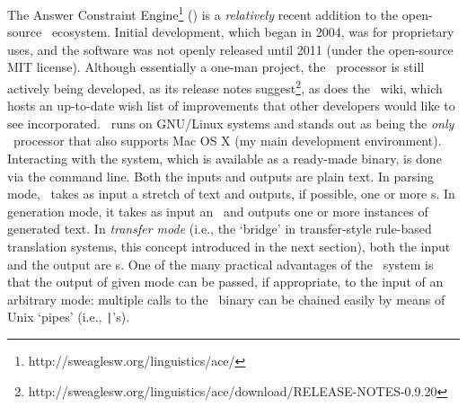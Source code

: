 The Answer Constraint Engine\footnote{http://sweaglesw.org/linguistics/ace/}
(\ace) \citep{sweaglesACE} is a \emph{relatively} recent addition to the
open-source \delphin\ ecosystem. Initial development, which began in 2004, was
for proprietary uses, and the software was not openly released until 2011
(under the open-source MIT license). Although essentially a one-man project,
the \ace\ processor is still actively being developed, as its release notes
suggest\footnote{http://sweaglesw.org/linguistics/ace/download/RELEASE-NOTES-0.9.20},
as does the \delphin\ wiki, which hosts an up-to-date wish list of improvements
that other developers would like to see incorporated. \ace\ runs on GNU/Linux
systems and stands out as being the \emph{only} \delphin\ processor that also
supports Mac OS X (my main development environment). Interacting with the
system, which is available as a ready-made binary, is done via the command
line. Both the inputs and outputs are plain text. In parsing mode, \ace\ takes
as input a stretch of text and outputs, if possible, one or more \mrs s. In
generation mode, it takes as input an \mrs\ and outputs one or more instances
of generated text. In \emph{transfer mode} (i.e., the `bridge' in
transfer-style rule-based translation systems, this concept introduced in the
next section), both the input and the output are \mrs s. One of the many
practical advantages of the \ace\ system is that the output of given mode can
be passed, if appropriate, to the input of an arbitrary mode: multiple calls to
the \ace\ binary can be chained easily by means of Unix `pipes' (i.e., {\texttt
|}'s).

